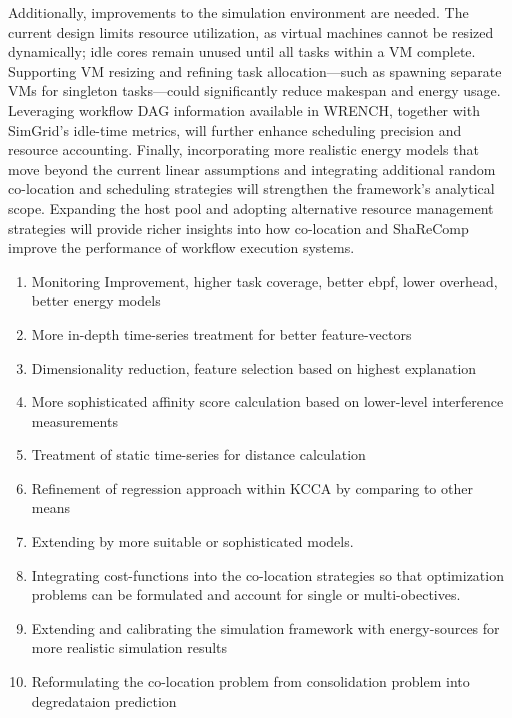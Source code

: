 Additionally, improvements to the simulation environment are needed. The current design limits resource utilization, as virtual machines cannot be resized dynamically; idle cores remain unused until all tasks within a VM complete. Supporting VM resizing and refining task allocation—such as spawning separate VMs for singleton tasks—could significantly reduce makespan and energy usage. Leveraging workflow DAG information available in WRENCH, together with SimGrid's idle-time metrics, will further enhance scheduling precision and resource accounting.
Finally, incorporating more realistic energy models that move beyond the current linear assumptions and integrating additional random co-location and scheduling strategies will strengthen the framework's analytical scope. Expanding the host pool and adopting alternative resource management strategies will provide richer insights into how co-location and ShaReComp improve the performance of workflow execution systems.


\begin{enumerate}
    \item Monitoring Improvement, higher task coverage, better ebpf, lower overhead, better energy models
    \item More in-depth time-series treatment for better feature-vectors
    \item Dimensionality reduction, feature selection based on highest explanation
    \item More sophisticated affinity score calculation based on lower-level interference measurements
    \item Treatment of static time-series for distance calculation
    \item Refinement of regression approach within KCCA by comparing to other means
    \item Extending by more suitable or sophisticated models.
    \item Integrating cost-functions into the co-location strategies so that optimization problems can be formulated and account for single or multi-obectives.
    \item Extending and calibrating the simulation framework with energy-sources for more realistic simulation results
    \item Reformulating the co-location problem from consolidation problem into degredataion prediction

\end{enumerate}